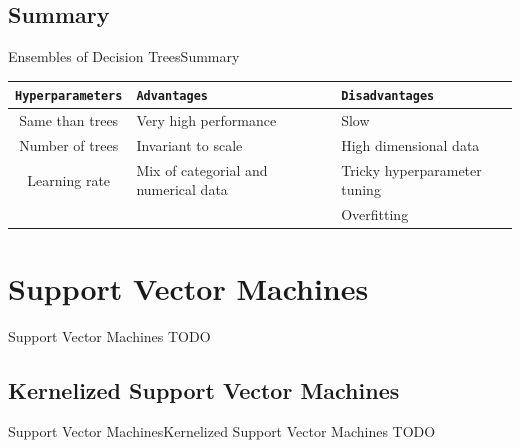 \documentclass[10pt,compress]{beamer} %
\begin{document}
\subsection{Summary}
\begin{frame}{Ensembles of Decision Trees}{Summary}
	\begin{center}
	\begin{tabular}{cp{3cm}p{3cm}}\hline
	 	\texttt{Hyperparameters}  & \texttt{Advantages}  & \texttt{Disadvantages} \\\hline
	 	Same than trees           & Very high performance& Slow  \\
	 	Number of trees           & Invariant to scale   & High dimensional data  \\
	 	Learning rate             & Mix of categorial and numerical data & Tricky hyperparameter tuning  \\
	 	                          &                      & Overfitting  \\
	 	\hline
	\end{tabular}
	\end{center}
\end{frame}

\section{Support Vector Machines}

\begin{frame}{Support Vector Machines}
    TODO
\end{frame}

\subsection{Kernelized Support Vector Machines}
\begin{frame}{Support Vector Machines}{Kernelized Support Vector Machines}
    TODO
\end{frame}
\end{document}
